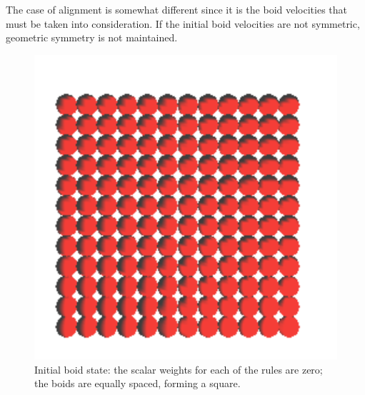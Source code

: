 The case of alignment is somewhat different since it is the boid velocities that must be taken into consideration. If the initial boid velocities are not symmetric, geometric symmetry is not maintained. 

\begin{figure}[htbp]
\begin{center}
\includegraphics[scale=0.5]{figures/align.pdf}
\caption{Initial boid state: the scalar weights for each of the rules are zero; the boids are equally spaced, forming a square.}
\label{alignRule}
\end{center}
\end{figure}

